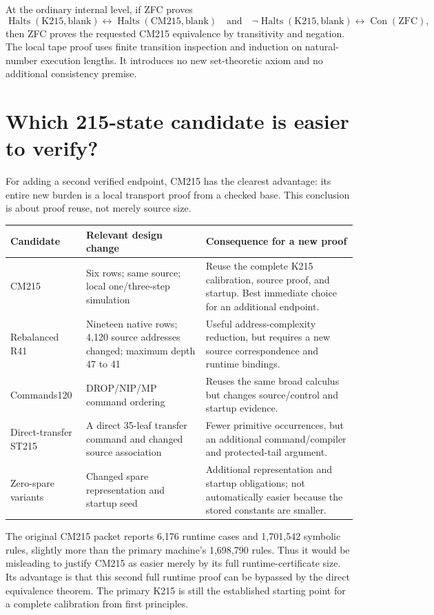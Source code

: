 \documentclass[11pt,letterpaper]{article}
\theoremstyle{definition}
\newcommand{\Halts}{\operatorname{Halts}}
\newcommand{\Con}{\operatorname{Con}}
\newcommand{\ZFC}{\mathrm{ZFC}}
\newcommand{\K}{\mathrm{K215}}
\newcommand{\CM}{\mathrm{CM215}}
\begin{document}
At the ordinary internal level, if ZFC proves
\[
 \Halts(\K,\mathrm{blank})\leftrightarrow
 \Halts(\CM,\mathrm{blank})
\quad\text{and}\quad
 \neg\Halts(\K,\mathrm{blank})\leftrightarrow\Con(\ZFC),
\]
then ZFC proves the requested CM215 equivalence by transitivity and
negation. The local tape proof uses finite transition inspection and
induction on natural-number execution lengths. It introduces no new
set-theoretic axiom and no additional consistency premise.

\section{Which 215-state candidate is easier to verify?}

For adding a second verified endpoint, CM215 has the clearest advantage:
its entire new burden is a local transport proof from a checked base.
This conclusion is about proof reuse, not merely source size.

\begin{center}
\begin{tabularx}{\textwidth}{@{}p{}p{}X@{}}
\toprule
Candidate & Relevant design change & Consequence for a new proof\\
\midrule
CM215 & Six rows; same source; local one/three-step simulation & Reuse
the complete K215 calibration, source proof, and startup. Best immediate
choice for an additional endpoint.\\
Rebalanced R41 & Nineteen native rows; 4,120 source addresses changed;
maximum depth 47 to 41 & Useful address-complexity reduction, but requires
a new source correspondence and runtime bindings.\\
Commands120 & DROP/NIP/MP command ordering & Reuses the same broad
calculus but changes source/control and startup evidence.\\
Direct-transfer ST215 & A direct 35-leaf transfer command and changed
source association & Fewer primitive occurrences, but an additional
command/compiler and protected-tail argument.\\
Zero-spare variants & Changed spare representation and startup seed &
Additional representation and startup obligations; not automatically
easier because the stored constants are smaller.\\
\bottomrule
\end{tabularx}
\end{center}

The original CM215 packet reports 6,176 runtime cases and 1,701,542
symbolic rules, slightly more than the primary machine's 1,698,790 rules.
Thus it would be misleading to justify CM215 as easier merely by its
full runtime-certificate size. Its advantage is that this second full
runtime proof can be bypassed by the direct equivalence theorem.
The primary K215 is still the established starting point for a complete
calibration from first principles.\cite{cm215,verification}
\end{document}
